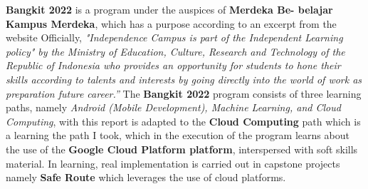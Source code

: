 \noindent \textbf{Bangkit 2022} is a program under the auspices of \textbf{Merdeka Be-
belajar Kampus Merdeka}, which has a purpose according to an excerpt from the website
Officially, \textit{"Independence Campus is part of the Independent Learning policy"
by the Ministry of Education, Culture, Research and Technology of the Republic of Indonesia
who provides an opportunity for students to hone their skills
according to talents and interests by going directly into the world of work as preparation
future career.”} The \textbf{Bangkit 2022} program consists of three learning paths, namely
\textit{Android (Mobile Development), Machine Learning, and Cloud Computing}, with
this report is adapted to the \textbf{Cloud Computing} path which is a learning
the path I took, which in the execution of the program learns about
the use of the \textbf{Google Cloud Platform platform}, interspersed with soft skills material.
In learning, real implementation is carried out in capstone projects
namely \textbf{Safe Route} which leverages the use of cloud platforms.

\vspace{5mm}